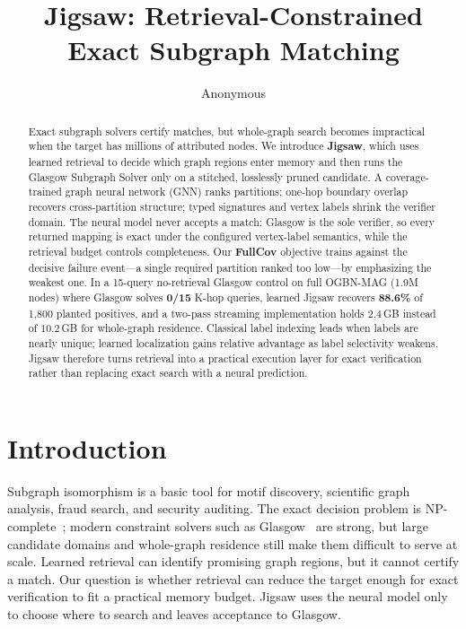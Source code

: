 \documentclass{article}
\title[Jigsaw]{Jigsaw: Retrieval-Constrained Exact Subgraph Matching}
\author[Anonymous]{Anonymous}
\begin{document}
\maketitle

\begin{abstract}
Exact subgraph solvers certify matches, but whole-graph search becomes impractical when the target has millions of attributed nodes. We introduce \textbf{Jigsaw}, which uses learned retrieval to decide which graph regions enter memory and then runs the Glasgow Subgraph Solver only on a stitched, losslessly pruned candidate. A coverage-trained graph neural network (GNN) ranks partitions; one-hop boundary overlap recovers cross-partition structure; typed signatures and vertex labels shrink the verifier domain. The neural model never accepts a match: Glasgow is the sole verifier, so every returned mapping is exact under the configured vertex-label semantics, while the retrieval budget controls completeness. Our \textbf{FullCov} objective trains against the decisive failure event---a single required partition ranked too low---by emphasizing the weakest one. In a 15-query no-retrieval Glasgow control on full OGBN-MAG (1.9M nodes) where Glasgow solves \textbf{0/15} K-hop queries, learned Jigsaw recovers \textbf{88.6\%} of 1,800 planted positives, and a two-pass streaming implementation holds $2.4$\,GB instead of $10.2$\,GB for whole-graph residence. Classical label indexing leads when labels are nearly unique; learned localization gains relative advantage as label selectivity weakens. Jigsaw therefore turns retrieval into a practical execution layer for exact verification rather than replacing exact search with a neural prediction.
\end{abstract}


\section{Introduction}

Subgraph isomorphism is a basic tool for motif discovery, scientific graph analysis, fraud search, and security auditing. The exact decision problem is NP-complete~\cite{ref_garey}; modern constraint solvers such as Glasgow~\cite{ref_glasgow} are strong, but large candidate domains and whole-graph residence still make them difficult to serve at scale. Learned retrieval can identify promising graph regions, but it cannot certify a match. Our question is whether retrieval can reduce the target enough for exact verification to fit a practical memory budget. Jigsaw uses the neural model only to choose where to search and leaves acceptance to Glasgow.
\end{document}
